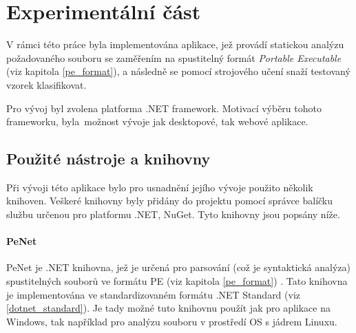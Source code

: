 \section{Experimentální část}
\label{ExperimentalPart}








V rámci této práce byla implementována aplikace, jež provádí statickou analýzu požadovaného souboru se zaměřením na spustitelný formát \emph{Portable Executable} (viz kapitola \ref{pe_format}), a následně se pomocí strojového učení snaží testovaný vzorek klasifikovat. 

Pro vývoj byl zvolena platforma .NET framework. Motivací výběru tohoto frameworku, byla~možnost vývoje jak desktopové, tak webové aplikace. %

\subsection{Použité nástroje a knihovny}
Při vývoji této aplikace bylo pro usnadnění jejího vývoje použito několik knihoven. Veškeré knihovny byly přidány do projektu pomocí správce balíčku službu určenou pro platformu .NET, NuGet. Tyto knihovny jsou popsány níže.

\paragraph*{PeNet}
\label{penet_lib}

PeNet je .NET knihovna, jež je určená pro parsování (což je syntaktická analýza) spustitelných souborů ve formátu PE (viz kapitola \ref{pe_format}) \cite{github_penet}. Tato knihovna je implementována ve standardizovaném formátu .NET Standard (viz \ref{dotnet_standard}). Je tady možné tuto knihovnu použít jak pro aplikace na Windows, tak například pro analýzu souboru v prostředí OS s jádrem Linuxu.

